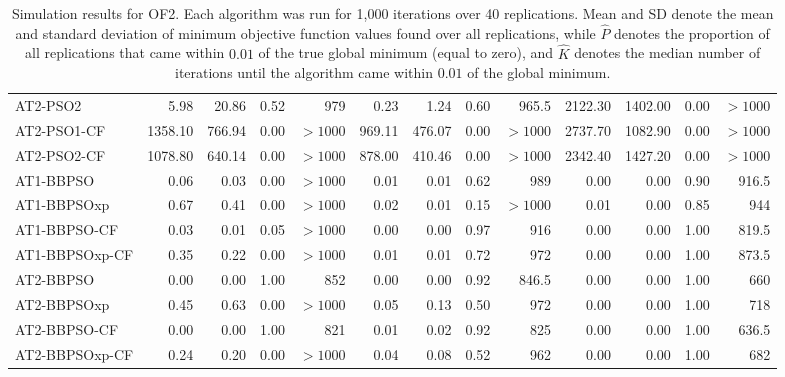 \documentclass[cmbright]{staauth}
\numberwithin{table}{section}
\begin{document}
\begin{table}[ht]
\begin{tabular}{l|rrrr|rrrr|rrrr}
  AT2-PSO2 & 5.98 & 20.86 & 0.52 & 979 & 0.23 & 1.24 & 0.60 & 965.5 & 2122.30 & 1402.00 & 0.00 & $> 1000$ \\
  AT2-PSO1-CF & 1358.10 & 766.94 & 0.00 & $> 1000$ & 969.11 & 476.07 & 0.00 & $> 1000$ & 2737.70 & 1082.90 & 0.00 & $> 1000$ \\
  AT2-PSO2-CF & 1078.80 & 640.14 & 0.00 & $> 1000$ & 878.00 & 410.46 & 0.00 & $> 1000$ & 2342.40 & 1427.20 & 0.00 & $> 1000$ \\
   \hline
AT1-BBPSO & 0.06 & 0.03 & 0.00 & $> 1000$ & 0.01 & 0.01 & 0.62 & 989 & 0.00 & 0.00 & 0.90 & 916.5 \\
  AT1-BBPSOxp & 0.67 & 0.41 & 0.00 & $> 1000$ & 0.02 & 0.01 & 0.15 & $> 1000$ & 0.01 & 0.00 & 0.85 & 944 \\
  AT1-BBPSO-CF & 0.03 & 0.01 & 0.05 & $> 1000$ & 0.00 & 0.00 & 0.97 & 916 & 0.00 & 0.00 & 1.00 & 819.5 \\
  AT1-BBPSOxp-CF & 0.35 & 0.22 & 0.00 & $> 1000$ & 0.01 & 0.01 & 0.72 & 972 & 0.00 & 0.00 & 1.00 & 873.5 \\
   \hline
AT2-BBPSO & 0.00 & 0.00 & 1.00 & 852 & 0.00 & 0.00 & 0.92 & 846.5 & 0.00 & 0.00 & 1.00 & 660 \\
  AT2-BBPSOxp & 0.45 & 0.63 & 0.00 & $> 1000$ & 0.05 & 0.13 & 0.50 & 972 & 0.00 & 0.00 & 1.00 & 718 \\
  AT2-BBPSO-CF & 0.00 & 0.00 & 1.00 & 821 & 0.01 & 0.02 & 0.92 & 825 & 0.00 & 0.00 & 1.00 & 636.5 \\
  AT2-BBPSOxp-CF & 0.24 & 0.20 & 0.00 & $> 1000$ & 0.04 & 0.08 & 0.52 & 962 & 0.00 & 0.00 & 1.00 & 682 \\
   \hline
\end{tabular}
\endgroup
\caption{Simulation results for OF2. Each algorithm was run for 1,000 iterations over 40 replications. Mean and SD denote the mean and standard deviation of minimum objective function values found over all replications, while $\widehat{P}$ denotes the proportion of all replications that came within $0.01$ of the true global minimum (equal to zero), and $\widehat{K}$ denotes the median number of iterations until the algorithm came within $0.01$ of the global minimum.}
\label{tab:psosim2}
\end{table}
\end{document}
